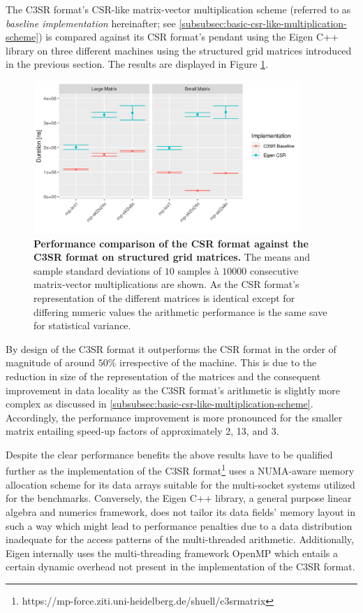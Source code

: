 \documentclass{article}
\begin{document}
    The C3SR format's CSR-like matrix-vector multiplication scheme (referred to as \emph{baseline implementation} hereinafter; see \ref{subsubsec:basic-csr-like-multiplication-scheme}) is compared against its CSR format's pendant using the Eigen C++ library \cite{eigen:website} on three different machines using the structured grid matrices introduced in the previous section. The results are displayed in Figure \ref{fig:baseline_arithmetic_performance}.

    \begin{figure}[!ht]
      \centering
      \includegraphics[width=0.9\textwidth]{assets/eigen_vs_c3sr_baseline}
      \caption[Performance comparison of the CSR format against the C3SR format on structured grid matrices.]{\textbf{Performance comparison of the CSR format against the C3SR format on structured grid matrices.} The means and sample standard deviations of $10$ samples à $10000$ consecutive matrix-vector multiplications are shown. As the CSR format's representation of the different matrices is identical except for differing numeric values the arithmetic performance is the same save for statistical variance.}
      \label{fig:baseline_arithmetic_performance}
    \end{figure}

    By design of the C3SR format it outperforms the CSR format in the order of magnitude of around $50\%$ irrespective of the machine. This is due to the reduction in size of the representation of the matrices and the consequent improvement in data locality as the C3SR format's arithmetic is slightly more complex as discussed in \ref{subsubsec:basic-csr-like-multiplication-scheme}. Accordingly, the performance improvement is more pronounced for the smaller matrix entailing speed-up factors of approximately 2, 13, and 3.

    Despite the clear performance benefits the above results have to be qualified further as the implementation of the C3SR format\footnote{https://mp-force.ziti.uni-heidelberg.de/shuell/c3srmatrix} uses a NUMA-aware memory allocation scheme for its data arrays suitable for the multi-socket systems utilized for the benchmarks. Conversely, the Eigen C++ library, a general purpose linear algebra and numerics framework, does not tailor its data fields' memory layout in such a way which might lead to performance penalties due to a data distribution inadequate for the access patterns of the multi-threaded arithmetic. Additionally, Eigen internally uses the multi-threading framework OpenMP \cite{openmp:website} which entails a certain dynamic overhead not present in the implementation of the C3SR format.
\end{document}
